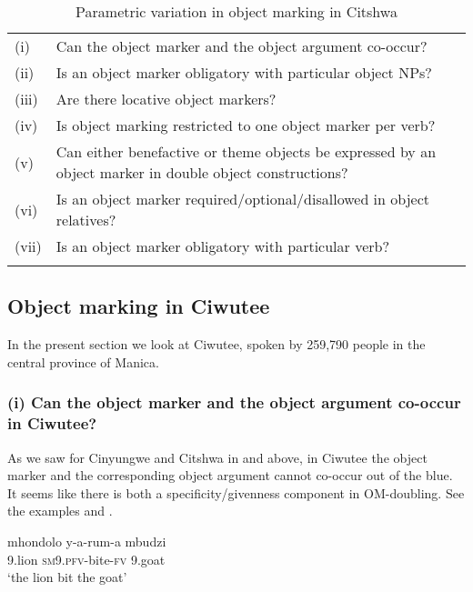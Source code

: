 \documentclass[output=paper]{langscibook}
\begin{document}
\begin{table}
\caption{\label{tab:ngunga:3} Parametric variation in object marking in Citshwa}

\begin{tabularx}{\textwidth}{lQl}

\lsptoprule

(i) & Can the object marker and the object argument co-occur? & \\
(ii) & Is an object marker obligatory with particular object NPs? & \\
(iii) & Are there locative object markers? & \\
(iv) & Is object marking restricted to one object marker per verb? & \\
(v) & Can either benefactive or theme objects be expressed by an object marker in double object constructions? & \\
(vi) & Is an object marker required/optional/disallowed in object relatives? & \\
(vii) & Is an object marker obligatory with particular verb? & \\
\lspbottomrule
\end{tabularx}
\end{table}

\subsection{Object marking in Ciwutee}\label{sec:ngunga:3.3}

In the present section we look at Ciwutee, spoken by 259,790 people in the central province of Manica. 

\subsubsection{(i) Can the object marker and the object argument co-occur in Ciwutee?}

As we saw for Cinyungwe and Citshwa in  and  above, in Ciwutee the object marker and the corresponding object argument cannot co-occur out of the blue. It seems like there is both a specificity/givenness component in OM-doubling. See the examples  and . 

\ea\label{ex:ngunga:41}
\ea\label{ex:ngunga:41a} \gll    mhondolo  y-a-rum-a  mbudzi \\
      9.lion    {\textsc{sm9}.\textsc{pfv}}{}-bite-{\textsc{fv}}  9.goat\\
    \glt ‘the lion bit the goat’
\end{document}
